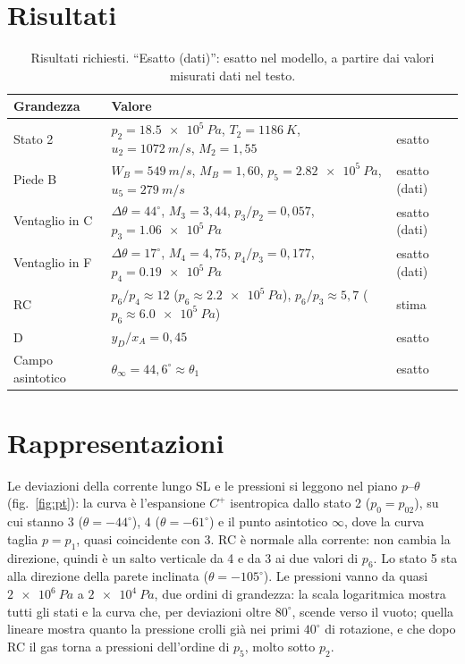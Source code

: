 \documentclass[11pt,a4paper]{article}
\newcommand{\Cp}{C^{+}}
\begin{document}
\section{Risultati}
\begin{table}[H]
  \centering
  \small
  \begin{tabular}{lll}
    \toprule
    Grandezza & Valore & \\
    \midrule
    Stato 2 & $p_2=\SI{18.5e5}{Pa}$, $T_2=\SI{1186}{K}$, $u_2=\SI{1072}{m/s}$, $M_2=1{,}55$ & esatto \\
    Piede B & $W_B=\SI{549}{m/s}$, $M_B=1{,}60$, $p_5=\SI{2.82e5}{Pa}$, $u_5=\SI{279}{m/s}$ & esatto (dati) \\
    Ventaglio in C & $\Delta\theta=44^\circ$, $M_3=3{,}44$, $p_3/p_2=0{,}057$, $p_3=\SI{1.06e5}{Pa}$ & esatto (dati) \\
    Ventaglio in F & $\Delta\theta=17^\circ$, $M_4=4{,}75$, $p_4/p_3=0{,}177$, $p_4=\SI{0.19e5}{Pa}$ & esatto (dati) \\
    RC & $p_6/p_4\approx12$ ($p_6\approx\SI{2.2e5}{Pa}$), $p_6/p_3\approx5{,}7$ ($p_6\approx\SI{6.0e5}{Pa}$) & stima \\
    D & $y_D/x_A=0{,}45$ & esatto \\
    Campo asintotico & $\theta_\infty=44{,}6^\circ\approx\theta_1$ & esatto \\
    \bottomrule
  \end{tabular}
  \caption{Risultati richiesti. ``Esatto (dati)'': esatto nel modello, a partire dai valori misurati dati nel testo.}
\end{table}

\section{Rappresentazioni}
Le deviazioni della corrente lungo SL e le pressioni si leggono nel piano $p$--$\theta$ (fig.~\ref{fig:pt}): la curva
è l'espansione $\Cp$ isentropica dallo stato 2 ($p_0=p_{02}$), su cui stanno 3 ($\theta=-44^\circ$), 4
($\theta=-61^\circ$) e il punto asintotico $\infty$, dove la curva taglia $p=p_1$, quasi coincidente con 3. RC è
normale alla corrente: non cambia la direzione, quindi è un salto verticale da 4 e da 3 ai due valori di $p_6$. Lo
stato 5 sta alla direzione della parete inclinata ($\theta=-105^\circ$). Le pressioni vanno da quasi
$\SI{2e6}{Pa}$ a $\SI{2e4}{Pa}$, due ordini di grandezza: la scala logaritmica mostra tutti gli stati e la curva
che, per deviazioni oltre $80^\circ$, scende verso il vuoto; quella lineare mostra quanto la pressione crolli già nei
primi $40^\circ$ di rotazione, e che dopo RC il gas torna a pressioni dell'ordine di $p_5$, molto sotto $p_2$.
\end{document}
